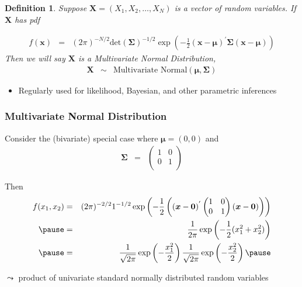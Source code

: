 \documentclass{beamer}
\newtheorem{defn}{Definition}
\numberwithin{equation}{section}
\begin{document}
\begin{frame}

\begin{defn}
Suppose $\boldsymbol{X} = (X_{1}, X_{2}, \hdots, X_{N}) $ is a vector of random variables.  If $\boldsymbol{X}$ has pdf 

\begin{eqnarray}
f(\boldsymbol{x}) & = & (2 \pi)^{-N/2} \text{det}\left(\boldsymbol{\Sigma}\right)^{-1/2} \exp\left(-\frac{1}{2}(\boldsymbol{x} - \boldsymbol{\mu})^{'}\boldsymbol{\Sigma} (\boldsymbol{x} - \boldsymbol{\mu} ) \right) \nonumber 
\end{eqnarray}
Then we will say $\boldsymbol{X}$ is a \alert{Multivariate Normal} Distribution, 
\begin{eqnarray}
\boldsymbol{X} & \sim & \text{Multivariate Normal} (\boldsymbol{\mu}, \boldsymbol{\Sigma}) \nonumber 
\end{eqnarray}


\end{defn}

\begin{itemize}
\item[-] \alert{Regularly} used for likelihood, Bayesian, and other parametric inferences
\end{itemize}



\end{frame}


\begin{frame}
\frametitle{Multivariate Normal Distribution}

Consider the (bivariate) special case where $\boldsymbol{\mu} = (0, 0)$ and 
\begin{eqnarray}
\boldsymbol{\Sigma} & = & \begin{pmatrix} 
1 & 0 \\
0 & 1 \\
\end{pmatrix}
\nonumber 
\end{eqnarray}

\pause 
Then 
\begin{eqnarray}
f(x_{1}, x_{2} ) & = & (2\pi)^{-2/2} 1^{-1/2} \exp\left(-\frac{1}{2}\left( (\boldsymbol{x}  - \boldsymbol{0} ) ^{'} \begin{pmatrix} 
1 & 0 \\
0 & 1 \\
\end{pmatrix}
(\boldsymbol{x}  - \boldsymbol{0} ) \right) \right) \nonumber \\ \pause 
& = & \frac{1}{2\pi} \exp\left(-\frac{1}{2} (x_{1}^{2} + x_{2} ^ 2 )     \right) \nonumber \\ \pause 
& = & \frac{1}{\sqrt{2\pi}} \exp\left(-\frac{x_{1}^{2}}{2}  \right) \frac{1}{\sqrt{2\pi}} \exp\left(-\frac{x_{2}^{2}}{2}  \right) \nonumber \pause 
\end{eqnarray}

$\leadsto$ product of univariate standard normally distributed random variables

\end{frame}
\end{document}
